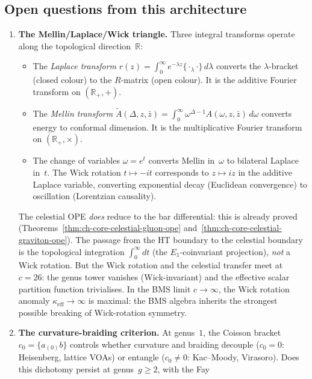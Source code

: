 \documentclass[11pt]{article}
\newcommand{\R}{\mathbb{R}}
\begin{document}
\subsection{Open questions from this architecture}

\begin{enumerate}
\item \textbf{The Mellin/Laplace/Wick triangle.}
  Three integral transforms operate along the topological
  direction~$\R$:
  \begin{itemize}
  \item The \emph{Laplace transform}
    $r(z) = \int_0^\infty e^{-\lambda z}
    \{{\cdot}_\lambda{\cdot}\}\,d\lambda$
    converts the $\lambda$-bracket (closed colour) to the
    $R$-matrix (open colour).  It is the additive Fourier
    transform on $(\R_+,{+})$.
  \item The \emph{Mellin transform}
    $\tilde{A}(\Delta,z,\bar z)
    = \int_0^\infty \omega^{\Delta-1}
    A(\omega,z,\bar z)\,d\omega$
    converts energy to conformal dimension.
    It is the multiplicative Fourier transform on
    $(\R_+,{\times})$.
  \item The change of variables $\omega = e^t$ converts
    Mellin in~$\omega$ to bilateral Laplace in~$t$.
    The Wick rotation $t \mapsto -it$ corresponds to
    $z \mapsto iz$ in the additive Laplace variable,
    converting exponential decay (Euclidean convergence)
    to oscillation (Lorentzian causality).
  \end{itemize}
  The celestial OPE \emph{does} reduce to the bar
  differential: this is already proved
  (Theorems~\ref*{thm:ch-core-celestial-gluon-ope}
  and~\ref*{thm:ch-core-celestial-graviton-ope}).
  The passage from the HT boundary to the celestial
  boundary is the topological integration
  $\int_0^\infty dt$ (the $E_1$-coinvariant projection),
  \emph{not} a Wick rotation.  But the Wick rotation and
  the celestial transfer meet at $c = 26$: the genus tower
  vanishes (Wick-invariant) and the effective scalar partition
  function trivialises.  In the BMS limit $c \to \infty$,
  the Wick rotation anomaly $\kappa_{\mathrm{eff}} \to \infty$
  is maximal: the BMS algebra inherits the strongest
  possible breaking of Wick-rotation symmetry.
\item \textbf{The curvature-braiding criterion.}  At genus~$1$,
  the Coisson bracket $c_0 = \{a_{(0)}b\}$ controls whether
  curvature and braiding decouple ($c_0 = 0$: Heisenberg,
  lattice VOAs) or entangle ($c_0 \ne 0$: Kac--Moody, Virasoro).
  Does this dichotomy persist at genus~$g \ge 2$, with the Fay

\end{enumerate}
\end{document}
